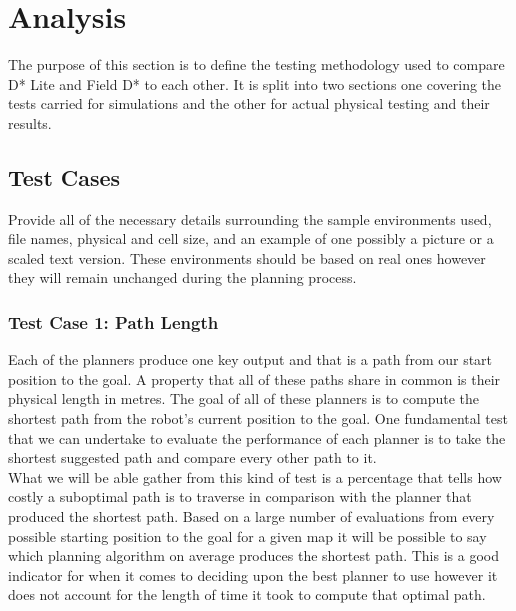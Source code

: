 \chapter{Analysis}

\noindent
The purpose of this section is to define the testing methodology used to compare D* Lite and Field D* to each other. It is split into two sections one covering the tests carried for simulations and the other for actual physical testing and their results.


\section{Test Cases}

\noindent
Provide all of the necessary details surrounding the sample environments used, file names, physical and cell size, and an example of one possibly a picture or a scaled text version. These environments should be based on real ones however they will remain unchanged during the planning process.

\newpage

\subsection{Test Case 1: Path Length}

\noindent 
Each of the planners produce one key output and that is a path from our start position to the goal. A property that all of these paths share in common is their physical length in metres. The goal of all of these planners is to compute the shortest path from the robot's current position to the goal. One fundamental test that we can undertake to evaluate the performance of each planner is to take the shortest suggested path and compare every other path to it. \\

\noindent
What we will be able gather from this kind of test is a percentage that tells how costly a suboptimal path is to traverse in comparison with the planner that produced the shortest path. Based on a large number of evaluations from every possible starting position to the goal for a given map it will be possible to say which planning algorithm on average produces the shortest path. This is a good indicator for when it comes to deciding upon the best planner to use however it does not account for the length of time it took to compute that optimal path. \\

